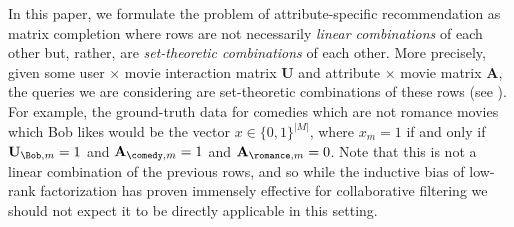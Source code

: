 


In this paper, we formulate the problem of attribute-specific recommendation as matrix completion where rows are not necessarily \emph{linear combinations} of each other but, rather, are \emph{set-theoretic combinations} of each other. More precisely, given some user $\times$ movie interaction matrix $\mathbf U$ and attribute $\times$ movie matrix $\mathbf A$, the queries we are considering are set-theoretic combinations of these rows (see ). For example, the ground-truth data for comedies which are not romance movies which Bob likes would be the vector $x \in \{0,1\}^{|M|}$, where $x_m = 1$ if and only if $\mathbf U_{\Bob, m} = 1$ and $\mathbf A_{\comedy, m} = 1$ and $\mathbf A_{\romance, m} = 0$. Note that this is not a linear combination of the previous rows, and so while the inductive bias of low-rank factorization has proven immensely effective for collaborative filtering we should not expect it to be directly applicable in this setting.


